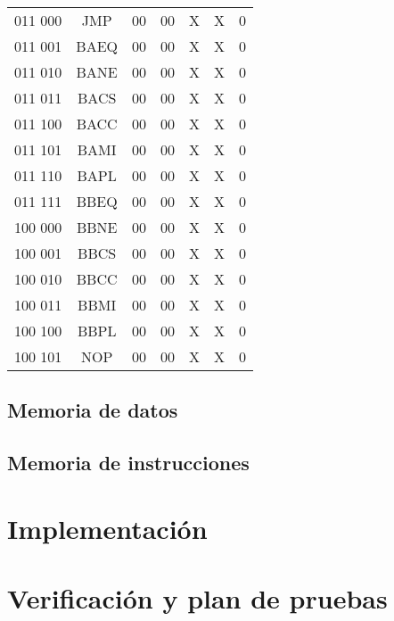 \documentclass[paper=letter, fontsize=12pt]{article}
\begin{document}
\begin{table}[h]
\begin{tabular}{cc|ccccc}
011 000 	& JMP			& 00 	& 00    & X     & X     & 0 \\
011 001 	& BAEQ			& 00 	& 00    & X     & X     & 0 \\
011 010 	& BANE			& 00 	& 00    & X     & X     & 0 \\
011 011 	& BACS			& 00 	& 00    & X     & X     & 0 \\
011 100 	& BACC			& 00 	& 00    & X     & X     & 0 \\
011 101 	& BAMI			& 00 	& 00    & X     & X     & 0 \\
011 110 	& BAPL			& 00 	& 00    & X     & X     & 0 \\
011 111 	& BBEQ			& 00 	& 00    & X     & X     & 0 \\
100 000 	& BBNE			& 00 	& 00    & X     & X     & 0 \\
100 001 	& BBCS			& 00 	& 00    & X     & X     & 0 \\
100 010 	& BBCC			& 00 	& 00    & X     & X     & 0 \\
100 011 	& BBMI			& 00 	& 00    & X     & X     & 0 \\
100 100 	& BBPL			& 00 	& 00    & X     & X     & 0 \\

100 101 	& NOP			& 00 	& 00    & X     & X     & 0 \\

\end{tabular}
\end{table}


\subsection{Memoria de datos}

\subsection{Memoria de instrucciones}

\section{Implementación}

\section{Verificación y plan de pruebas}
\end{document}

